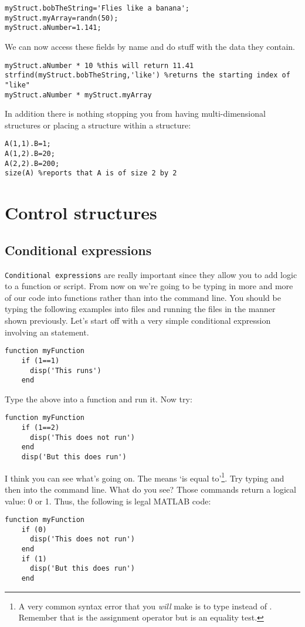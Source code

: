 \documentclass{article}
\begin{document}
\begin{lstlisting}
myStruct.bobTheString='Flies like a banana';
myStruct.myArray=randn(50);
myStruct.aNumber=1.141;
\end{lstlisting}

We can now access these fields by name and do stuff with the data they contain. 
\begin{lstlisting}
myStruct.aNumber * 10 %this will return 11.41
strfind(myStruct.bobTheString,'like') %returns the starting index of "like"
myStruct.aNumber * myStruct.myArray
\end{lstlisting}

In addition there is nothing stopping you from having multi-dimensional structures or placing a structure within a structure:

\begin{lstlisting}
A(1,1).B=1;
A(1,2).B=20; 
A(2,2).B=200;
size(A) %reports that A is of size 2 by 2
\end{lstlisting}


\pagebreak


\section*{Control structures}



\subsection*{Conditional expressions}
\verb|Conditional expressions| are really important since they allow you to add logic to a function or script. From now on we're going to be typing in more and more of our code into functions rather than into the command line. You should be typing the following examples into files and running the files in the manner shown previously. Let's start off with a very simple conditional expression involving an  statement. 

\begin{lstlisting}
function myFunction
	if (1==1)
	  disp('This runs')
	end
\end{lstlisting}

Type the above into a function and run it. Now try:
\begin{lstlisting}
function myFunction
	if (1==2)
	  disp('This does not run')
	end
	disp('But this does run')
\end{lstlisting}

I think you can see what's going on. The \mcode{==} means `is equal to'\footnote{A very common syntax error that you \textit{will} make is to type  instead of . Remember that \mcode{=} is the assignment operator but \mcode{==} is an equality test. 
}. Try typing  and then  into the command line. What do you see? Those commands return a logical value: 0 or 1. Thus, the following is legal MATLAB code:
\begin{lstlisting}
function myFunction
	if (0)
	  disp('This does not run')
	end
	if (1)
	  disp('But this does run')
    end
\end{lstlisting}
\end{document}
